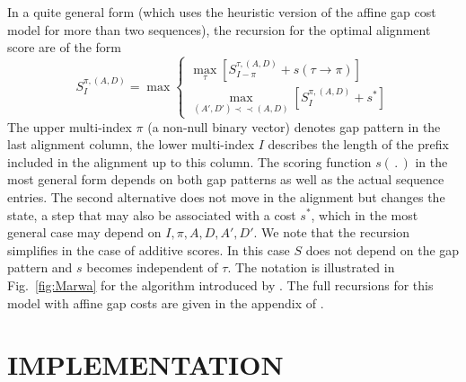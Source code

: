 \documentclass[a4paper,10pt]{article}
\newcommand{\pprec}{\mathrel{\prec\!\!\!\prec}}
\begin{document}
In a quite general form (which uses the heuristic version of the affine gap
cost model for more than two sequences), the recursion for the optimal
alignment score are of the form
\begin{equation} 
  S^{\pi,(A,D)}_I = \max 
      \begin{cases}
        \displaystyle\max_{\tau} 
            \left[ S^{\tau,(A,D)}_{I-\pi} + s(\tau\to\pi)
                    \right]
        \\
        \displaystyle\max_{(A',D')\pprec(A,D)}  
                    \left[ S^{\pi,(A,D)}_I + s^*\right]
       \end{cases} 
\label{eq:maxrec}
\end{equation}
The upper multi-index $\pi$ (a non-null binary vector) denotes gap pattern
in the last alignment column, the lower multi-index $I$ describes the
length of the prefix included in the alignment up to this column. The
scoring function $s(\,.\,)$ in the most general form depends on both gap
patterns as well as the actual sequence entries. The second alternative
does not move in the alignment but changes the state, a step that may also
be associated with a cost $s^*$, which in the most general case may depend
on $I,\pi,A,D,A',D'$.  We note that the recursion simplifies in the case of
additive scores. In this case $S$ does not depend on the gap pattern and
$s$ becomes independent of $\tau$. The notation is illustrated in
Fig.~\ref{fig:Marwa} for the algorithm introduced by \citet{AlArab:17a}.
The full recursions for this model with affine gap costs are given in the
appendix of \citet{Retzlaff:18a}.

\section{\uppercase{Implementation}}
\end{document}
